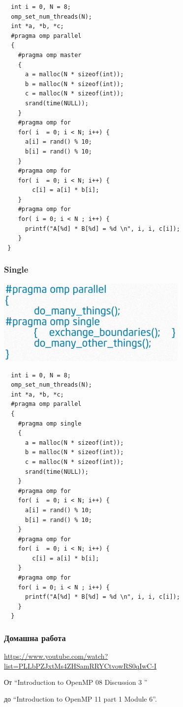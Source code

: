 \documentclass{beamer}
\begin{document}
\begin{frame}
 \scriptsize
\lstset{language=C++}
\begin{lstlisting}
  int i = 0, N = 8;
  omp_set_num_threads(N);
  int *a, *b, *c;
  #pragma omp parallel
  {
    #pragma omp master
    {
      a = malloc(N * sizeof(int));
      b = malloc(N * sizeof(int));
      c = malloc(N * sizeof(int));
      srand(time(NULL));
    }
    #pragma omp for
    for( i  = 0; i < N; i++) {
      a[i] = rand() % 10;  
      b[i] = rand() % 10;
    }
    #pragma omp for
    for( i  = 0; i < N; i++) {
        c[i] = a[i] * b[i];
    }
    #pragma omp for
    for( i = 0; i < N ; i++) {
      printf("A[%d] * B[%d] = %d \n", i, i, c[i]);
    }
 }
\end{lstlisting}
\end{frame}


\begin{frame}
  \frametitle{Single}
  \centering
  \includegraphics[width=0.7\textwidth]{single}
\end{frame}


\begin{frame}
\scriptsize
\lstset{language=C++}
\begin{lstlisting}
  int i = 0, N = 8;
  omp_set_num_threads(N);
  int *a, *b, *c;
  #pragma omp parallel
  {
    #pragma omp single
    {
      a = malloc(N * sizeof(int));
      b = malloc(N * sizeof(int));
      c = malloc(N * sizeof(int));
      srand(time(NULL));
    }
    #pragma omp for
    for( i  = 0; i < N; i++) {
      a[i] = rand() % 10;  
      b[i] = rand() % 10;
    }
    #pragma omp for
    for( i  = 0; i < N; i++) {
        c[i] = a[i] * b[i];
    }
    #pragma omp for
    for( i = 0; i < N ; i++) {
      printf("A[%d] * B[%d] = %d \n", i, i, c[i]);
    }
  }
\end{lstlisting}
\end{frame}


\begin{frame}
  \frametitle{Домашна работа}
\url{https://www.youtube.com/watch?list=PLLbPZJxtMs4ZHSamRRYCtvowRS0qIwC-I}  

От ``Introduction to OpenMP 08 Discussion 3 ''
 
до ``Introduction to OpenMP 11 part 1 Module 6''.
\end{frame}
\end{document}
